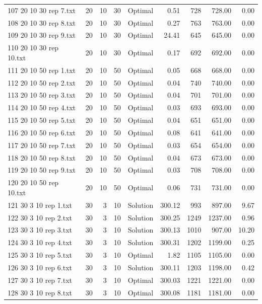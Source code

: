 \begin{longtable}{lrrllrrrr}
107 20 10 30 rep 7.txt & 20 & 10 & 30 & Optimal &  0.51 & 728 & 728.00 &  0.00\\
108 20 10 30 rep 8.txt & 20 & 10 & 30 & Optimal &  0.27 & 763 & 763.00 &  0.00\\
109 20 10 30 rep 9.txt & 20 & 10 & 30 & Optimal & 24.41 & 645 & 645.00 &  0.00\\
110 20 10 30 rep 10.txt & 20 & 10 & 30 & Optimal &  0.17 & 692 & 692.00 &  0.00\\
111 20 10 50 rep 1.txt & 20 & 10 & 50 & Optimal &  0.05 & 668 & 668.00 &  0.00\\
112 20 10 50 rep 2.txt & 20 & 10 & 50 & Optimal &  0.04 & 740 & 740.00 &  0.00\\
113 20 10 50 rep 3.txt & 20 & 10 & 50 & Optimal &  0.04 & 701 & 701.00 &  0.00\\
114 20 10 50 rep 4.txt & 20 & 10 & 50 & Optimal &  0.03 & 693 & 693.00 &  0.00\\
115 20 10 50 rep 5.txt & 20 & 10 & 50 & Optimal &  0.04 & 651 & 651.00 &  0.00\\
116 20 10 50 rep 6.txt & 20 & 10 & 50 & Optimal &  0.08 & 641 & 641.00 &  0.00\\
117 20 10 50 rep 7.txt & 20 & 10 & 50 & Optimal &  0.03 & 654 & 654.00 &  0.00\\
118 20 10 50 rep 8.txt & 20 & 10 & 50 & Optimal &  0.04 & 673 & 673.00 &  0.00\\
119 20 10 50 rep 9.txt & 20 & 10 & 50 & Optimal &  0.03 & 708 & 708.00 &  0.00\\
120 20 10 50 rep 10.txt & 20 & 10 & 50 & Optimal &  0.06 & 731 & 731.00 &  0.00\\
121 30 3 10 rep 1.txt & 30 & 3 & 10 & Solution & 300.12 & 993 & 897.00 &  9.67\\
122 30 3 10 rep 2.txt & 30 & 3 & 10 & Solution & 300.25 & 1249 & 1237.00 &  0.96\\
123 30 3 10 rep 3.txt & 30 & 3 & 10 & Solution & 300.13 & 1010 & 907.00 & 10.20\\
124 30 3 10 rep 4.txt & 30 & 3 & 10 & Solution & 300.31 & 1202 & 1199.00 &  0.25\\
125 30 3 10 rep 5.txt & 30 & 3 & 10 & Optimal &  1.82 & 1105 & 1105.00 &  0.00\\
126 30 3 10 rep 6.txt & 30 & 3 & 10 & Solution & 300.11 & 1203 & 1198.00 &  0.42\\
127 30 3 10 rep 7.txt & 30 & 3 & 10 & Optimal & 300.03 & 1221 & 1221.00 &  0.00\\
128 30 3 10 rep 8.txt & 30 & 3 & 10 & Optimal & 300.08 & 1181 & 1181.00 &  0.00\\

\end{longtable}
